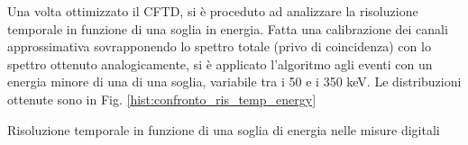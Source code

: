 Una volta ottimizzato il CFTD, si è proceduto ad analizzare la risoluzione temporale in funzione di una soglia in energia. Fatta una calibrazione dei canali approssimativa sovrapponendo lo spettro totale (privo di coincidenza) con lo spettro ottenuto analogicamente, si è applicato l'algoritmo agli eventi con un energia minore di una di una soglia, variabile tra i 50 e i 350 keV. Le distribuzioni ottenute sono in Fig. \ref{hist:confronto_ris_temp_energy}



\begin{tabella}[h]
	\centering
	
	\caption{Risoluzione temporale in funzione di una soglia di energia nelle misure digitali}
	\label{tab:threshold_fwhm_digi}
\end{tabella}
